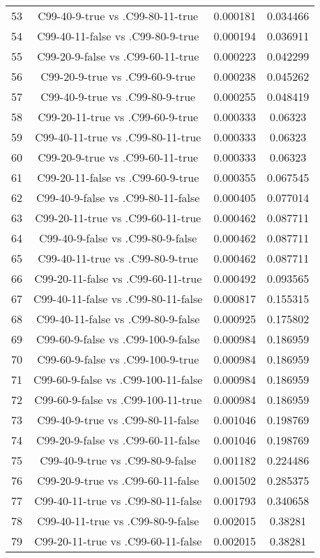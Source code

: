 \documentclass[a4paper,10pt]{article}
\begin{document}
\begin{landscape}
\begin{table}[!htp]
\begin{tabular}{cccc}
53&C99-40-9-true vs .C99-80-11-true&0.000181&0.034466\\
54&C99-40-11-false vs .C99-80-9-true&0.000194&0.036911\\
55&C99-20-9-false vs .C99-60-11-true&0.000223&0.042299\\
56&C99-20-9-true vs .C99-60-9-true&0.000238&0.045262\\
57&C99-40-9-true vs .C99-80-9-true&0.000255&0.048419\\
58&C99-20-11-true vs .C99-60-9-true&0.000333&0.06323\\
59&C99-40-11-true vs .C99-80-11-true&0.000333&0.06323\\
60&C99-20-9-true vs .C99-60-11-true&0.000333&0.06323\\
61&C99-20-11-false vs .C99-60-9-true&0.000355&0.067545\\
62&C99-40-9-false vs .C99-80-11-false&0.000405&0.077014\\
63&C99-20-11-true vs .C99-60-11-true&0.000462&0.087711\\
64&C99-40-9-false vs .C99-80-9-false&0.000462&0.087711\\
65&C99-40-11-true vs .C99-80-9-true&0.000462&0.087711\\
66&C99-20-11-false vs .C99-60-11-true&0.000492&0.093565\\
67&C99-40-11-false vs .C99-80-11-false&0.000817&0.155315\\
68&C99-40-11-false vs .C99-80-9-false&0.000925&0.175802\\
69&C99-60-9-false vs .C99-100-9-false&0.000984&0.186959\\
70&C99-60-9-false vs .C99-100-9-true&0.000984&0.186959\\
71&C99-60-9-false vs .C99-100-11-false&0.000984&0.186959\\
72&C99-60-9-false vs .C99-100-11-true&0.000984&0.186959\\
73&C99-40-9-true vs .C99-80-11-false&0.001046&0.198769\\
74&C99-20-9-false vs .C99-60-11-false&0.001046&0.198769\\
75&C99-40-9-true vs .C99-80-9-false&0.001182&0.224486\\
76&C99-20-9-true vs .C99-60-11-false&0.001502&0.285375\\
77&C99-40-11-true vs .C99-80-11-false&0.001793&0.340658\\
78&C99-40-11-true vs .C99-80-9-false&0.002015&0.38281\\
79&C99-20-11-true vs .C99-60-11-false&0.002015&0.38281\\

\end{tabular}
\end{table}
\end{landscape}
\end{document}
